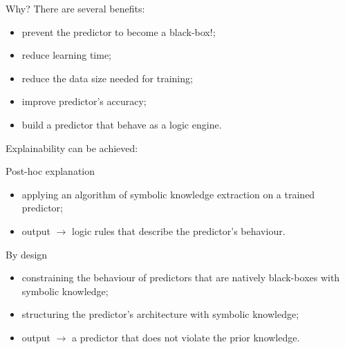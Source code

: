\documentclass[presentation]{beamer}\mode<presentation>{\usetheme{AMSBolognaFC}}
\begin{document}
\begin{frame}[allowframebreaks]{\skilong}
    \framebreak
    
    \begin{block}{Why?}
        There are several benefits:
        \begin{itemize}
            \item prevent the predictor to become a black-box\alert{!};
            \item reduce learning time;
            \item reduce the data size needed for training;
            \item improve predictor's accuracy;
            \item build a predictor that behave as a logic engine.
        \end{itemize}
    \end{block}
    
    \framebreak
    
    Explainability can be achieved: 
    \begin{block}{Post-hoc explanation}
        \begin{itemize}
            \item applying an algorithm of symbolic knowledge extraction on a trained predictor;
            \item output $\rightarrow$ logic rules that describe the predictor's behaviour.
        \end{itemize}    
    \end{block}
    
    \begin{block}{By design}
        \begin{itemize}
            \item constraining the behaviour of predictors that are natively black-boxes with symbolic knowledge;
            \item structuring the predictor's architecture with symbolic knowledge;
            \item output $\rightarrow$ a predictor that does not violate the prior knowledge.
        \end{itemize}
    \end{block}
    
    \framebreak
    

\end{frame}
\end{document}
